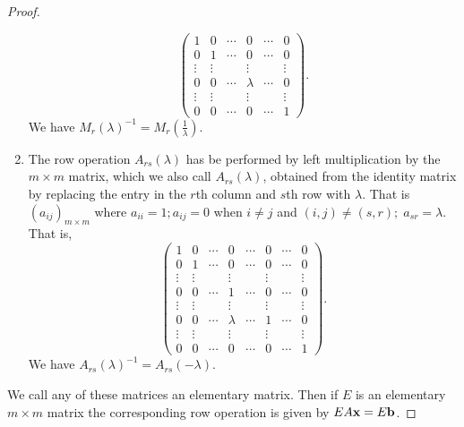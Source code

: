 \documentclass[10pt, a4paper]{article}
\begin{document}
\begin{theorem}[continues = pre:linalg:thm:lintoech]
\begin{proof}
\begin{enumerate}[label = (\alph*)]
\[\begin{pmatrix}
                1 & 0 & \dotsi & 0 & \dotsi & 0 \\
                0 & 1 & \dotsi & 0 & \dotsi & 0 \\
                \vdots & \vdots & \phantom{} & \vdots & \phantom{} & \vdots \\
                0 & 0 & \dotsi & \lambda & \dotsi & 0 \\
                \vdots & \vdots & \phantom{} & \vdots & \phantom{} & \vdots \\
                0 & 0 & \dotsi & 0 & \dotsi & 1
            \end{pmatrix}.
            \]
            We have $M_r(\lambda) ^ {-1} = M_r\left(\frac{1}{\lambda}\right)$.
            \item The row operation $A_{rs}(\lambda)$ has be performed by left multiplication by the $m \times m$ matrix,
            which we also call $A_{rs}(\lambda)$,
            obtained from the identity matrix by replacing the entry in the $r$th column and $s$th row with $\lambda$.
            That is $(a_{ij})_{m \times m}$ where $a_{ii} = 1; a_{ij} = 0$ when $i \neq j$ and $(i, j) \neq (s, r);\; a_{sr} = \lambda$.
            That is,
            \[
            \begin{pmatrix}
                1 & 0 & \dotsi & 0 & \dotsi & 0 & \dotsi & 0 \\
                0 & 1 & \dotsi & 0 & \dotsi & 0 & \dotsi & 0 \\
                \vdots & \vdots & \phantom{} & \vdots & \phantom{} & \vdots & \phantom{} & \vdots \\
                0 & 0 & \dotsi & 1 & \dotsi & 0 & \dotsi & 0 \\
                \vdots & \vdots & \phantom{} & \vdots & \phantom{} & \vdots & \phantom{} & \vdots \\
                0 & 0 & \dotsi & \lambda & \dotsi & 1 & \dotsi & 0 \\
                \vdots & \vdots & \phantom{} & \vdots & \phantom{} & \vdots & \phantom{} & \vdots \\
                0 & 0 & \dotsi & 0 & \dotsi & 0 & \dotsi & 1
            \end{pmatrix}.
            \]
            We have $A_{rs}(\lambda) ^ {-1} = A_{rs}(-\lambda)$.
        \end{enumerate}
        We call any of these matrices an elementary matrix.
        Then if $E$ is an elementary $m \times m$ matrix the corresponding row operation is given by $EA\mathbf{x} = E\mathbf{b}$.
    \end{proof}
\end{theorem}
\end{document}
